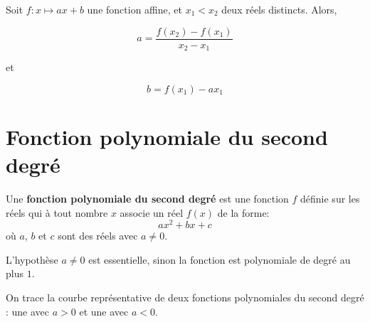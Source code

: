 \documentclass{poly}
\begin{document}
\begin{proposition}
Soit $f : x \mapsto ax + b$ une fonction affine, et $x_1 < x_2$ deux réels distincts. Alors,

\noindent\begin{minipage}{0.5\textwidth}
\begin{equation*}
a = \dfrac{f(x_2) - f(x_1)}{x_2 - x_1}
\end{equation*}
\end{minipage}
et
\begin{minipage}{0.5\textwidth}
\begin{equation*}
b = f(x_1) - ax_1
\end{equation*}
\end{minipage}
\end{proposition}

\newpage
\section{Fonction polynomiale du second degré}

\begin{definition}
Une \textbf{fonction polynomiale du second degré} est une fonction $f$ définie sur les réels qui à tout nombre $x$ associe un réel $f(x)$ de la forme:
\begin{equation*}
ax^2+bx+c   
\end{equation*}
où $a$, $b$ et $c$ sont des réels avec $a \neq 0$. 
\end{definition}

\begin{remark}
L'hypothèse $a \neq 0$ est essentielle, sinon la fonction est polynomiale de degré au plus $1$.    
\end{remark}

On trace la courbe représentative de deux fonctions polynomiales du second degré : une avec $a > 0$ et une avec $a < 0$.
\end{document}

